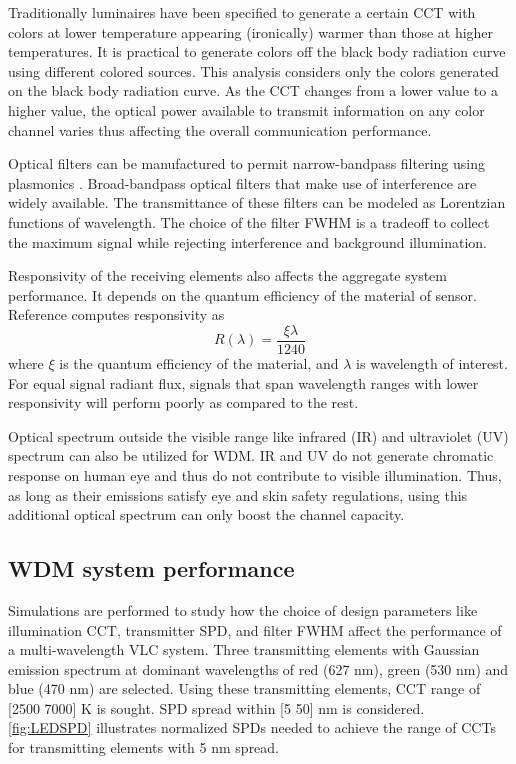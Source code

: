 Traditionally luminaires have been specified to generate a certain CCT with colors at lower temperature appearing (ironically) warmer than those at higher temperatures. It is practical to generate colors off the black body radiation curve using different colored sources. This analysis considers only the colors generated on the black body radiation curve. As the CCT changes from a lower value to a higher value, the optical power available to transmit information on any color channel varies thus affecting the overall communication performance.

Optical filters can be manufactured to permit narrow-bandpass filtering using plasmonics \cite{xu10a,yok12a}. Broad-bandpass optical filters that make use of interference are widely available. The transmittance of these filters can be modeled as Lorentzian functions of wavelength. The choice of the filter FWHM is a tradeoff to collect the maximum signal while rejecting interference and background illumination.

Responsivity of the receiving elements also affects the aggregate system performance. It depends on the quantum efficiency of the material of sensor. Reference \cite{gha12a} computes responsivity as
\begin{equation}
\label{eqResponsivity}
	 R(\lambda) = \frac{\xi\lambda}{1240}
\end{equation}
where $\xi$ is the quantum efficiency of the material, and $\lambda$ is wavelength of interest. For equal signal radiant flux, signals that span wavelength ranges with lower responsivity will perform poorly as compared to the rest. 

Optical spectrum outside the visible range like infrared (IR) and ultraviolet (UV) spectrum can also be utilized for WDM. IR and UV do not generate chromatic response on human eye and thus do not contribute to visible illumination. Thus, as long as their emissions satisfy eye and skin safety regulations, using this additional optical spectrum can only boost the channel capacity.

\subsection{WDM system performance}
\label{subsec:wdmSystemAnalysis}
Simulations are performed to study how the choice of design parameters like illumination CCT, transmitter SPD, and filter FWHM affect the performance of a multi-wavelength VLC system. Three transmitting elements with Gaussian emission spectrum at dominant wavelengths of red (627 nm), green (530 nm) and blue (470 nm) are selected. Using these transmitting elements, CCT range of [2500 7000] K is sought. SPD spread within [5 50] nm is considered. \figurename{ \ref{fig:LEDSPD}} illustrates normalized SPDs needed to achieve the range of CCTs for transmitting elements with 5 nm spread.


